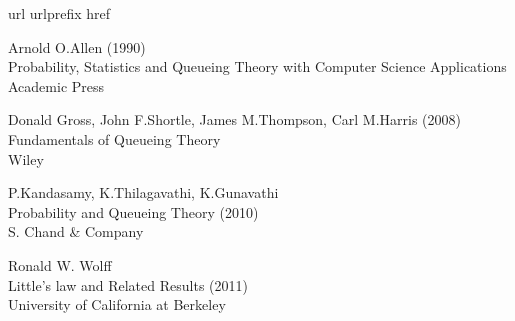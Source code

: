 \documentclass[a4paper,10pt]{scrartcl}
\theoremstyle{definition}
\numberwithin{equation}{section}
\begin{document}
\newpage
\begin{thebibliography}{10}
  \expandafter\ifx\csname url\endcsname\relax
  \def\url#1{\texttt{#1}}\fi
  \expandafter\ifx\csname urlprefix\endcsname\relax\def\urlprefix{URL }\fi
  \expandafter\ifx\csname href\endcsname\relax
  \def\href#1#2{#2} \def\path#1{#1}\fi

  Arnold O.Allen (1990)\\
  Probability, Statistics and Queueing Theory with Computer Science Applications\\
  Academic Press

  Donald Gross, John F.Shortle, James M.Thompson, Carl M.Harris (2008)\\
  Fundamentals of Queueing Theory\\
  Wiley
  
  P.Kandasamy, K.Thilagavathi, K.Gunavathi\\
  Probability and Queueing Theory (2010)\\
  S. Chand \& Company

  Ronald W. Wolff\\
  Little's law and Related Results (2011)\\
  University of California at Berkeley
\end{thebibliography}
\end{document}
